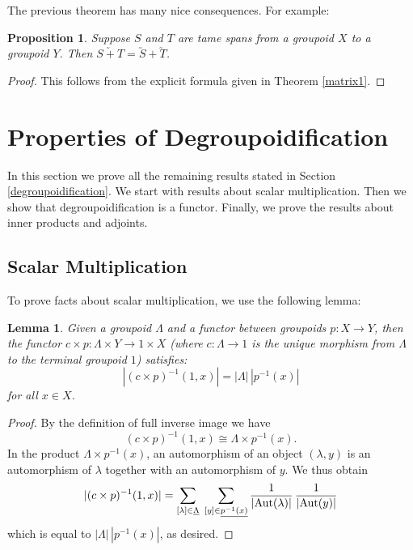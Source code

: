 \documentclass{article}
\renewcommand{\to}{\rightarrow}
\newcommand{\maps}{\colon}
\newcommand{\iso}{\cong}
\newcommand{\Aut}{{\rm Aut}}
\renewcommand{\u}[1]{\underline{#1}}
\newtheorem{lemma}[thm]{Lemma}
\newtheorem{proposition}[thm]{Proposition}
\begin{document}
The previous theorem has many nice consequences.  For example:

\begin{proposition}
\label{add_spans}
Suppose $S$ and $T$ are tame spans from a groupoid $X$ to a groupoid
$Y$.  Then $\utilde{S+T} = \utilde{S} + \utilde{T}$.
\end{proposition}

\begin{proof}
This follows from the explicit formula given in Theorem \ref{matrix1}.
\end{proof}

\section{Properties of Degroupoidification}
\label{properties}

In this section we prove all the remaining results stated in Section
\ref{degroupoidification}.  We start with results about scalar
multiplication.  Then we show that degroupoidification is a functor.
Finally, we prove the results about inner products and adjoints.

\subsection{Scalar Multiplication}
\label{scalar_mult}

To prove facts about scalar multiplication, we use the following lemma:

\begin{lemma}\label{essinverseproduct} 
Given a groupoid $\Lambda$ and a functor between groupoids $p\maps X\to Y$,
then the functor $c\times p \maps \Lambda\times Y\to 1\times X$ (where
$c\maps \Lambda\to 1$ is the unique morphism from $\Lambda$ to the terminal
groupoid $1$) satisfies:
\[ |(c\times p)^{-1}(1, x)|=|\Lambda| \, |p^{-1}(x)| \]
for all $x \in X$.
\end{lemma}

\begin{proof}
By the definition of full inverse image we have
\[(c\times p)^{-1}(1, x) \iso \Lambda \times p^{-1}(x)  .\]
In the product $\Lambda \times p^{-1}(x)$, an automorphism of an
object $(\lambda,y)$ is an automorphism of $\lambda$ together with
an automorphism of $y$.  We thus obtain
\[|(c\times p)^{-1}(1, x)| = 
\sum_{[\lambda] \in \u{\Lambda}} \;
\sum_{[y]\in \u{p^{-1}(x)}} 
\frac{1}{|\Aut(\lambda)|} \,
\frac{1}{|\Aut(y)|}\]
which is equal to $|\Lambda|\,|p^{-1}(x)|$, as desired.
\end{proof}
\end{document}
